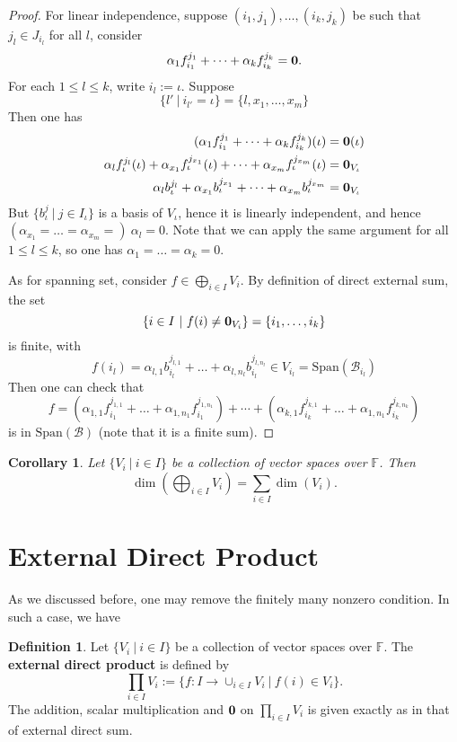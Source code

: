 \documentclass[11pt,openany]{book}
\theoremstyle{plain}
\newtheorem{corollary}[corollary]{Corollary}
\theoremstyle{definition}
\newtheorem{definition}[definition]{Definition}
\theoremstyle{remark}
\begin{document}
\begin{proof}
    For linear independence, suppose $(i_1, j_1), \dots, (i_k,j_k)$ be such that $j_l \in J_{i_l}$ for all $l$, consider
    $$\alpha_1 f_{i_1}^{j_1} + \dots + \alpha_k f_{i_k}^{j_k} = {\bf 0}.$$
    For each $1 \leq l \leq k$, write $i_l := \iota$. Suppose
    $$\{l'\ |\ i_{l'} = \iota\} = \{l, x_1, \dots, x_m\}$$
    Then one has
    \begin{align*}
    (\alpha_1 f_{i_1}^{j_1} + \dots + \alpha_k f_{i_k}^{j_k})(\iota) &= {\bf 0}(\iota)\\
    \alpha_{l} f_{\iota}^{j_l}(\iota)+ \alpha_{x_1} f_{\iota}^{j_{x_1}}(\iota) + \dots + \alpha_{x_m} f_{\iota}^{j_{x_m}}(\iota) &= {\bf 0}_{V_{\iota}}\\
    \alpha_{l} b_{\iota}^{j_l} + \alpha_{x_1} b_{\iota}^{j_{x_1}} + \dots + \alpha_{x_m} b_{\iota}^{j_{x_m}} &= {\bf 0}_{V_{\iota}}
    \end{align*}
But $\{b_{\iota}^j\ |\ j \in I_{\iota}\}$ is a basis of $V_{\iota}$, hence it is linearly independent, and hence $(\alpha_{x_1} = \dots = \alpha_{x_m} =)\  \alpha_l = 0$. Note that we can apply the same argument for all $1 \leq l \leq k$, so one has $\alpha_1 = \dots = \alpha_k = 0$.

As for spanning set, consider $f \in \bigoplus_{i \in I} V_i$. By definition of direct external sum, the set 
$$\{i \in I\ |\ f(i) \neq {\bf 0}_{V_i}\} = \{i_1, \dots, i_k\}$$
is finite, with
$$f(i_l) = \alpha_{l,1} b_{i_l}^{j_{l,1}} + \dots + \alpha_{l,n_l} b_{i_l}^{j_{l,n_l}} \in V_{i_l} = \mathrm{Span}(\mathcal{B}_{i_l})$$
Then one can check that
$$f = (\alpha_{1,1} f_{i_1}^{j_{1,1}} + \dots + \alpha_{1,n_1} f_{i_1}^{j_{1,n_1}}) + \cdots + (\alpha_{k,1} f_{i_k}^{j_{k,1}} + \dots + \alpha_{1,n_1} f_{i_k}^{j_{k,n_k}})$$
is in $\mathrm{Span}(\mathcal{B})$ (note that it is a finite sum).
\end{proof}


\begin{corollary}
   Let $\{V_i\ |\ i \in I\}$ be a collection of vector spaces over $\mathbb{F}$. Then 
   $$\dim(\bigoplus_{i \in I} V_i) = \sum_{i \in I} \dim(V_i).$$
\end{corollary}

\section{External Direct Product}
As we discussed before, one may remove the finitely many nonzero condition. In such a case, we have
\begin{definition}
Let $\{V_i\ |\ i \in I\}$ be a collection of vector spaces over $\mathbb{F}$. The {\bf external direct product} is defined by
$$\prod_{i \in I} V_i := \{f: I \to \cup_{i \in I} V_i \ |\ f(i) \in V_i\}.$$
The addition, scalar multiplication and ${\bf 0}$ on $\prod_{i \in I} V_i$ is given exactly as in that of external direct sum.
\end{definition}
\end{document}

